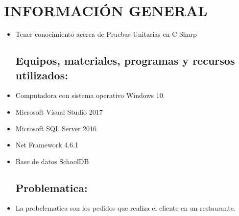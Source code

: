 \section{INFORMACIÓN GENERAL} 

\begin{itemize}
\subsection{Objetivos:}
	\item Tener conocimiento acerca de Pruebas Unitarias en C Sharp

\subsection{Equipos, materiales, programas y recursos utilizados:}
	\item Computadora con sistema operativo Windows 10.
	\item Microsoft Visual Studio 2017
	\item Microsoft SQL Server 2016
	\item Net Framework 4.6.1
	\item Base de datos SchoolDB

\subsection{Problematica:}
	\item La probelematica son los pedidos que realiza el cliente en un restaurante.

\end{itemize}